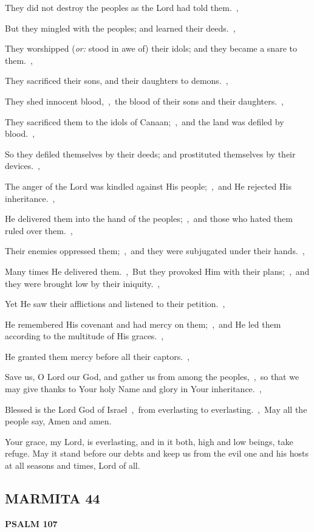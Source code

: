 \documentclass[12pt,twoside,a5paper]{article}
\newcommand{\marmita}[1]{\subsection*{MARMITA {#1}}}
\newcommand{\psalm}[1]{\textbf{PSALM {#1}}\nopagebreak}
\newcommand{\slota}[1]{\liturgicalhint{Slota.} #1}
\newcommand{\translationoption}[1]{\emph{or:} #1}
\begin{document}
\begin{normalparskip}
  They did not destroy the peoples as the Lord had told them.~\sep

  But they mingled with the peoples; and learned their deeds.~\sep

  They worshipped (\translationoption{stood in awe of}) their idols; and they became a snare to them.~\sep

  They sacrificed their sons, and their daughters to demons.~\sep

  They shed innocent blood,~\sep\ the blood of their sons and their daughters.~\sep

  They sacrificed them to the idols of Canaan;~\sep\ and the land was defiled by blood.~\sep

  So they defiled themselves by their deeds; and prostituted themselves by their devices.~\sep

  The anger of the Lord was kindled against His people;~\sep\ and He rejected His inheritance.~\sep

  He delivered them into the hand of the peoples;~\sep\ and those who hated them ruled over them.~\sep

  Their enemies oppressed them;~\sep\ and they were subjugated under their hands.~\sep

  Many times He delivered them.~\sep\ But they provoked Him with their plans;~\sep\ and they were brought low by their iniquity.~\sep

  Yet He saw their afflictions and listened to their petition.~\sep

  He remembered His covenant and had mercy on them;~\sep\ and He led them according to the multitude of His graces.~\sep

  He granted them mercy before all their captors.~\sep

  Save us, O Lord our God, and gather us from among the peoples,~\sep\ so that we may give thanks to Your holy Name and glory in Your inheritance.~\sep

  Blessed is the Lord God of Israel~\sep\ from everlasting to everlasting.~\sep\ May all the people say, Amen and amen.
\end{normalparskip}

\slota{Your grace, my Lord, is everlasting, and in it both, high and low beings, take refuge. May it stand before our debts and keep us from the evil one and his hosts at all seasons and times, Lord of all.}

\marmita{44}

\psalm{107}
\end{document}
